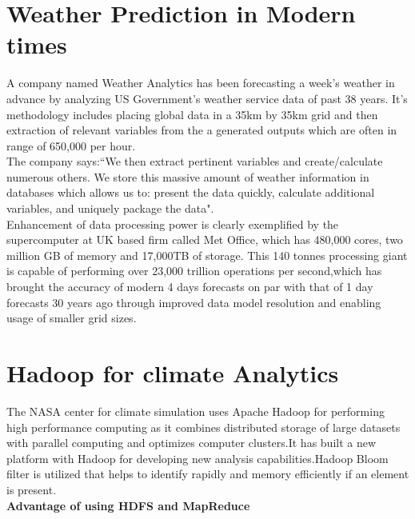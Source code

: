 \documentclass[sigconf]{acmart}
\begin{document}
\section{Weather Prediction in Modern times}

A company named Weather Analytics has been forecasting a week's weather in advance by analyzing US Government's weather service data of past 38 years. It's methodology includes placing global data in a 35km by 35km grid and then extraction of relevant variables from the a generated outputs which are often in range of 650,000 per hour.\\

The company says:``We then extract pertinent variables and create/calculate numerous others. We store this massive amount of weather information in databases which allows us to: present the data quickly, calculate additional variables, and uniquely package the data"\cite{Zdnet}.\\

Enhancement of data processing power is clearly exemplified by the supercomputer at UK based firm called Met Office, which has 480,000 cores, two million GB of memory and 17,000TB of storage. This 140 tonnes processing giant is capable of performing over 23,000 trillion operations per second,which has brought the accuracy of modern 4 days forecasts on par with that of 1 day forecasts 30 years ago through improved data model resolution and enabling usage of smaller grid sizes\cite{Zdnet}.

\section{Hadoop for climate Analytics}

The NASA center for climate simulation uses Apache Hadoop for performing high performance computing as it combines distributed storage of large datasets with parallel computing and optimizes computer clusters.It has built a new platform with Hadoop for developing new analysis capabilities.Hadoop Bloom filter is utilized that helps to identify rapidly and memory efficiently if an element is present.\\


\textbf{Advantage of using HDFS and MapReduce}
\end{document}
